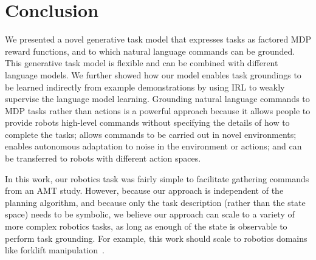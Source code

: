 \documentclass[conference]{IEEEtran}
\begin{document}

\section{Conclusion}
We presented a novel generative task model that expresses tasks as factored MDP reward functions, and to which natural language commands can be grounded. This generative task model is flexible and can be combined with different language models. We further showed how our model enables task groundings to be learned indirectly from example demonstrations by using IRL to weakly supervise the language model learning. Grounding natural language commands to MDP tasks rather than actions is a powerful approach because it allows people to provide robots high-level commands without specifying the details of how to complete the tasks; allows commands to be carried out in novel environments; enables autonomous adaptation to noise in the environment or actions; and can be transferred to robots with different action spaces.



In this work, our robotics task was fairly simple to facilitate gathering commands from an AMT study. However, because our approach is independent of the planning algorithm, and because only the task description (rather than the state space) needs to be symbolic, we believe our approach can scale to a variety of more complex robotics tasks, as long as enough of the state is observable to perform task grounding. For example, this work should scale to robotics domains like forklift manipulation~\cite{teller2010voice}.
\end{document}
